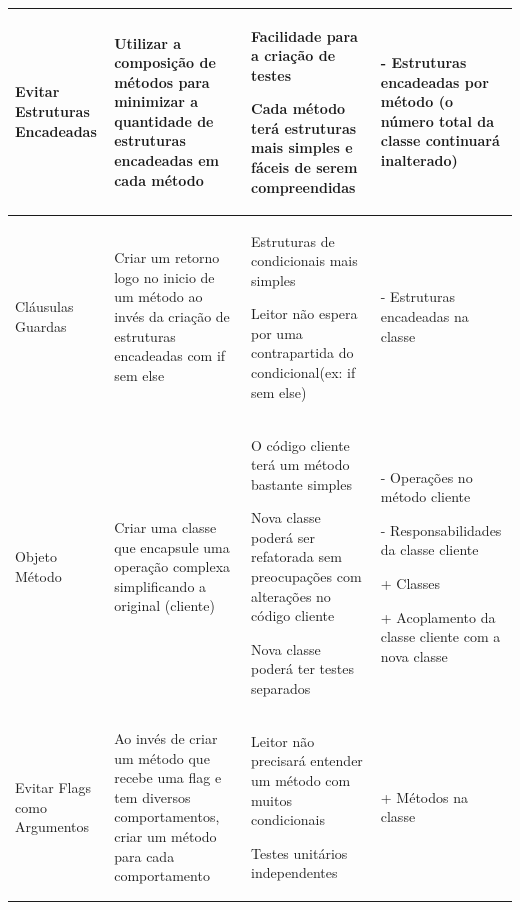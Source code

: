 \begin{landscape}
\begin{table}[hbt]
\begin{tabular}{|p{3.5cm}|p{5cm}|p{8.5cm}|p{7.2cm}|}
\hline 
Evitar Estruturas Encadeadas
& Utilizar a composição de métodos para minimizar a quantidade de estruturas encadeadas em cada método
& \begin{my_itemize}
	\item Facilidade para a criação de testes
	\item Cada método terá estruturas mais simples e fáceis de serem compreendidas
  \end{my_itemize}
& \begin{my_itemize}
	\item[-] Estruturas encadeadas por método (o número total da classe continuará inalterado)
  \end{my_itemize}
\tabularnewline

\hline 
Cláusulas Guardas
& Criar um retorno logo no inicio de um método ao invés da criação de estruturas encadeadas com if sem else
& \begin{my_itemize}
	\item Estruturas de condicionais mais simples
	\item Leitor não espera por uma contrapartida do condicional(ex: if sem else)
  \end{my_itemize}
& \begin{my_itemize}
	\item[-] Estruturas encadeadas na classe
  \end{my_itemize}
\tabularnewline

\hline
Objeto Método
& Criar uma classe que encapsule uma operação complexa simplificando a original (cliente)
& \begin{my_itemize}
	\item O código cliente terá um método bastante simples
	\item Nova classe poderá ser refatorada sem preocupações com alterações no código cliente
	\item Nova classe poderá ter testes separados
  \end{my_itemize}
& \begin{my_itemize}
	\item[-] Operações no método cliente
	\item[-] Responsabilidades da classe cliente
	\item[+] Classes
	\item[+] Acoplamento da classe cliente com a nova classe
  \end{my_itemize}
\tabularnewline

\hline
Evitar Flags como Argumentos
& Ao invés de criar um método que recebe uma flag e tem diversos comportamentos, criar  um  método para cada comportamento
& \begin{my_itemize}
	\item Leitor não precisará entender um método com muitos condicionais
	\item Testes unitários independentes
  \end{my_itemize}
& \begin{my_itemize}
	\item[+] Métodos na classe
  \end{my_itemize}
\tabularnewline


\end{tabular}
\end{table}
\end{landscape}
